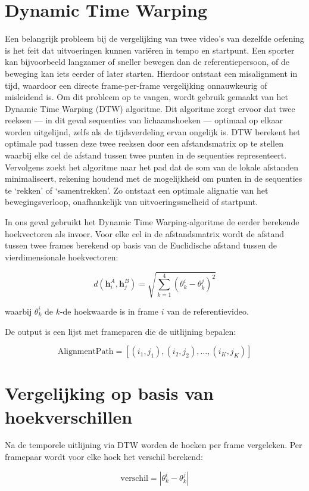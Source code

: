 \section{Dynamic Time Warping}
Een belangrijk probleem bij de vergelijking van twee video’s van dezelfde oefening is het feit dat uitvoeringen kunnen variëren in tempo en startpunt. 
Een sporter kan bijvoorbeeld langzamer of sneller bewegen dan de referentiepersoon, of de beweging kan iets eerder of later starten. 
Hierdoor ontstaat een misalignment in tijd, waardoor een directe frame-per-frame vergelijking onnauwkeurig of misleidend is.
Om dit probleem op te vangen, wordt gebruik gemaakt van het Dynamic Time Warping (DTW) algoritme. 
Dit algoritme zorgt ervoor dat twee reeksen — in dit geval sequenties van lichaamshoeken — optimaal op elkaar worden uitgelijnd, zelfs als de tijdsverdeling ervan ongelijk is. 
DTW berekent het optimale pad tussen deze twee reeksen door een afstandsmatrix op te stellen waarbij elke cel de afstand tussen twee punten in de sequenties representeert. 
Vervolgens zoekt het algoritme naar het pad dat de som van de lokale afstanden minimaliseert, rekening houdend met de mogelijkheid om punten in de sequenties te ‘rekken’ of ‘samentrekken’. 
Zo ontstaat een optimale alignatie van het bewegingsverloop, onafhankelijk van uitvoeringssnelheid of startpunt.

In ons geval gebruikt het Dynamic Time Warping-algoritme de eerder berekende hoekvectoren als invoer. Voor elke cel in de afstandsmatrix wordt de afstand tussen twee frames berekend op basis van de Euclidische afstand tussen de vierdimensionale hoekvectoren:

\[
d(\mathbf{h}_i^A, \mathbf{h}_j^B) = \sqrt{\sum_{k=1}^{4} (\theta_k^i - \theta_k^j)^2}
\]

waarbij $\theta_k^i$ de $k$-de hoekwaarde is in frame $i$ van de referentievideo.

De output is een lijst met frameparen die de uitlijning bepalen:

\[
\text{AlignmentPath} = \left[ (i_1, j_1), (i_2, j_2), \dots, (i_K, j_K) \right]
\]

\section{Vergelijking op basis van hoekverschillen}
Na de temporele uitlijning via DTW worden de hoeken per frame vergeleken. Per framepaar wordt voor elke hoek het verschil berekend:

\[
\text{verschil} = \left| \theta_k^i - \theta_k^j \right|
\]

